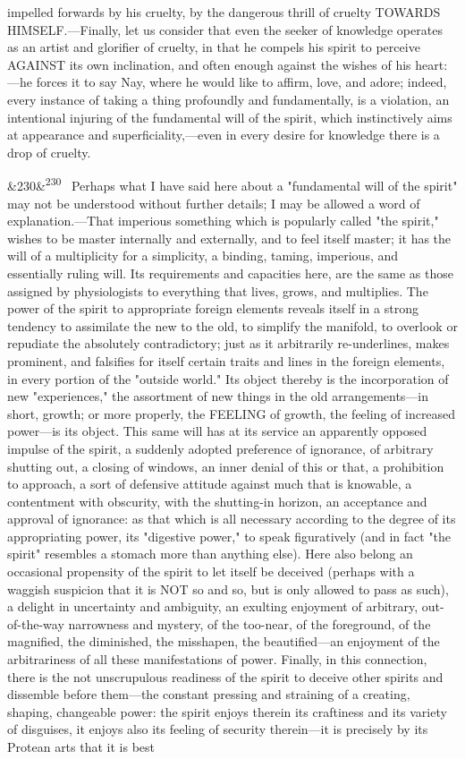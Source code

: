 \documentclass[12pt]{article}
\newcommand{\para}[1][]{\par\noindent\ifx&#1&\else\textsuperscript{\footnotesize #1}~\fi}
\begin{document}
impelled forwards by his cruelty, by the dangerous thrill of cruelty TOWARDS HIMSELF.---Finally, let us consider that even the seeker of knowledge operates as an artist and glorifier of cruelty, in that he compels his spirit to perceive AGAINST its own inclination, and often enough against the wishes of his heart:---he forces it to say Nay, where he would like to affirm, love, and adore; indeed, every instance of taking a thing profoundly and fundamentally, is a violation, an intentional injuring of the fundamental will of the spirit, which instinctively aims at appearance and superficiality,---even in every desire for knowledge there is a drop of cruelty.

\para[230] Perhaps what I have said here about a "fundamental will of the spirit" may not be understood without further details; I may be allowed a word of explanation.---That imperious something which is popularly called "the spirit," wishes to be master internally and externally, and to feel itself master; it has the will of a multiplicity for a simplicity, a binding, taming, imperious, and essentially ruling will. Its requirements and capacities here, are the same as those assigned by physiologists to everything that lives, grows, and multiplies. The power of the spirit to appropriate foreign elements reveals itself in a strong tendency to assimilate the new to the old, to simplify the manifold, to overlook or repudiate the absolutely contradictory; just as it arbitrarily re-underlines, makes prominent, and falsifies for itself certain traits and lines in the foreign elements, in every portion of the "outside world." Its object thereby is the incorporation of new "experiences," the assortment of new things in the old arrangements---in short, growth; or more properly, the FEELING of growth, the feeling of increased power---is its object. This same will has at its service an apparently opposed impulse of the spirit, a suddenly adopted preference of ignorance, of arbitrary shutting out, a closing of windows, an inner denial of this or that, a prohibition to approach, a sort of defensive attitude against much that is knowable, a contentment with obscurity, with the shutting-in horizon, an acceptance and approval of ignorance: as that which is all necessary according to the degree of its appropriating power, its "digestive power," to speak figuratively (and in fact "the spirit" resembles a stomach more than anything else). Here also belong an occasional propensity of the spirit to let itself be deceived (perhaps with a waggish suspicion that it is NOT so and so, but is only allowed to pass as such), a delight in uncertainty and ambiguity, an exulting enjoyment of arbitrary, out-of-the-way narrowness and mystery, of the too-near, of the foreground, of the magnified, the diminished, the misshapen, the beautified---an enjoyment of the arbitrariness of all these manifestations of power. Finally, in this connection, there is the not unscrupulous readiness of the spirit to deceive other spirits and dissemble before them---the constant pressing and straining of a creating, shaping, changeable power: the spirit enjoys therein its craftiness and its variety of disguises, it enjoys also its feeling of security therein---it is precisely by its Protean arts that it is best 
\end{document}
